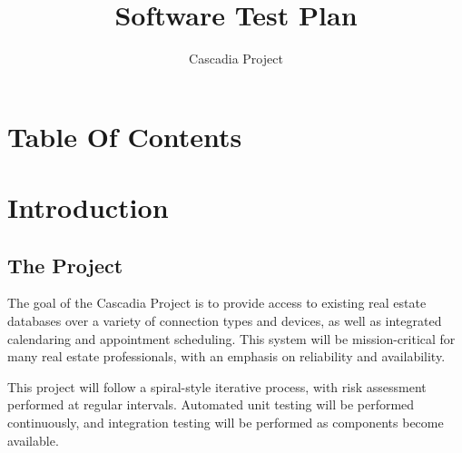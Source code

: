 \documentclass[11pt]{wacomepd}
\begin{document}
\date{Cascadia Project} 
\title{Software Test Plan} 
\maketitle


\chapter{Table Of Contents}
\tableofcontents
\clearpage


\chapter{Introduction}


\section{The Project}
The goal of the Cascadia Project is to provide access to existing real estate databases over a
variety of connection types and devices, as well as integrated calendaring and appointment
scheduling.  This system will be mission-critical for many real estate professionals, with an
emphasis on reliability and availability.

This project will follow a spiral-style iterative process, with risk assessment performed at regular
intervals.  Automated unit testing will be performed continuously, and integration testing will be
performed as components become available.
\end{document}
